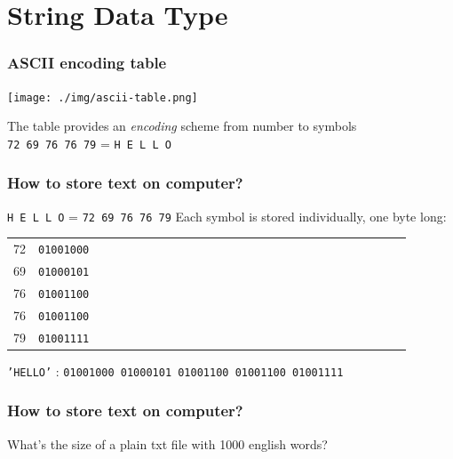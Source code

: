 \documentclass[11pt]{beamer}
\begin{document}
\fi
\section{String Data Type}


\begin{frame}
  \frametitle{ASCII encoding table}
  \Enlarge
  \texttt{[image: ./img/ascii-table.png]} \\ \pause
  
  {\small The table provides an \emph{encoding} scheme from number to symbols} \\
  \texttt{72 69 76 76 79} = \texttt{H E L L O} %
  
\end{frame}

\begin{frame}
  \frametitle{How to store text on computer?}
  \Enlarge

  \begin{itemize}
  \myitem \texttt{H E L L O} = \texttt{72 69 76 76 79} \pause
  \myitem  Each symbol is stored individually, one byte long: \\
   \vspace{2mm} \pause
    \begin{tabular}{*{27}{l}}
      72 & \texttt{01001000} \\
      69 & \texttt{01000101} \\
      76 & \texttt{01001100} \\
      76 & \texttt{01001100} \\
      79 & \texttt{01001111} \\
    \end{tabular} \pause
    
    \vspace{2mm}
    {\small \texttt{'HELLO'} : \textcolor{CS101GradBot}{\texttt{01001000 01000101 01001100 01001100 01001111}}}
  \end{itemize}
\end{frame}

\begin{frame}
  \frametitle{How to store text on computer?}
  \Enlarge

  \begin{itemize}
   \myitem What's the size of a plain txt file with 1000 english words? 
  \end{itemize}
\end{frame}
\end{document}
